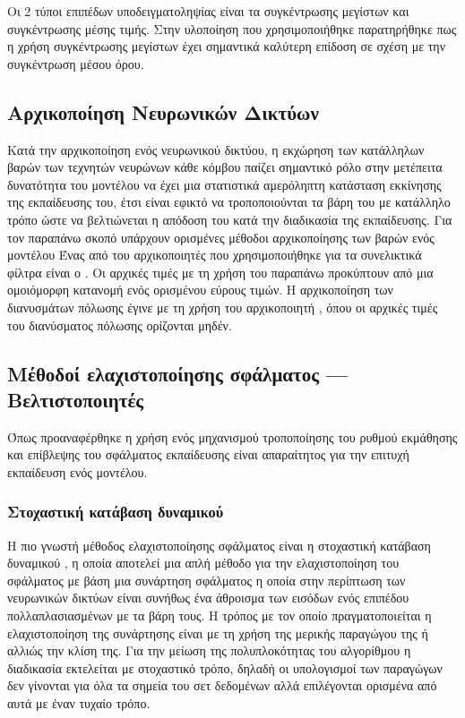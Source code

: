 Οι 2 τύποι επιπέδων υποδειγματοληψίας είναι τα συγκέντρωσης μεγίστων και συγκέντρωσης μέσης τιμής. Στην υλοποίηση που χρησιμοποιήθηκε παρατηρήθηκε πως η χρήση συγκέντρωσης μεγίστων έχει σημαντικά καλύτερη επίδοση σε σχέση με την συγκέντρωση μέσου όρου.

\subsection{Αρχικοποίηση Νευρωνικών Δικτύων}
Κατά την αρχικοποίηση ενός νευρωνικού δικτύου, η εκχώρηση των κατάλληλων βαρών των τεχνητών νευρώνων κάθε κόμβου παίζει σημαντικό ρόλο στην μετέπειτα δυνατότητα του μοντέλου να έχει μια στατιστικά αμερόληπτη κατάσταση εκκίνησης της εκπαίδευσης του, έτσι είναι εφικτό να τροποποιούνται τα βάρη του με κατάλληλο τρόπο ώστε να βελτιώνεται η απόδοση του κατά την διαδικασία της εκπαίδευσης.
Για τον παραπάνω σκοπό υπάρχουν ορισμένες μέθοδοι αρχικοποίησης των βαρών ενός μοντέλου
Ένας από του αρχικοποιητές που χρησιμοποιήθηκε για τα συνελικτικά φίλτρα είναι ο . Οι αρχικές τιμές με τη χρήση του παραπάνω προκύπτουν από μια ομοιόμορφη κατανομή ενός ορισμένου εύρους τιμών. Η αρχικοποίηση των διανυσμάτων πόλωσης έγινε με τη χρήση του αρχικοποιητή
 , όπου οι αρχικές τιμές του διανύσματος πόλωσης ορίζονται μηδέν.

\subsection{Μέθοδοί ελαχιστοποίησης σφάλματος --- Βελτιστοποιητές }
Όπως προαναφέρθηκε η χρήση ενός μηχανισμού τροποποίησης του ρυθμού εκμάθησης και επίβλεψης του σφάλματος εκπαίδευσης είναι απαραίτητος για την επιτυχή εκπαίδευση ενός μοντέλου. 
\subsubsection{Στοχαστική κατάβαση δυναμικού }
Η πιο γνωστή μέθοδος ελαχιστοποίησης σφάλματος είναι η στοχαστική κατάβαση δυναμικού , η οποία αποτελεί μια απλή μέθοδο για την ελαχιστοποίηση του σφάλματος με βάση μια συνάρτηση σφάλματος η οποία στην περίπτωση των νευρωνικών δικτύων είναι συνήθως ένα άθροισμα των εισόδων ενός επιπέδου πολλαπλασιασμένων με τα βάρη τους. Η τρόπος με τον οποίο πραγματοποιείται η ελαχιστοποίηση της συνάρτησης είναι με τη χρήση της μερικής παραγώγου της ή αλλιώς την κλίση της. Για την μείωση της πολυπλοκότητας του αλγορίθμου η διαδικασία εκτελείται με στοχαστικό τρόπο, δηλαδή οι υπολογισμοί των παραγώγων δεν γίνονται για όλα τα σημεία του σετ δεδομένων αλλά επιλέγονται ορισμένα από αυτά με έναν τυχαίο τρόπο.
